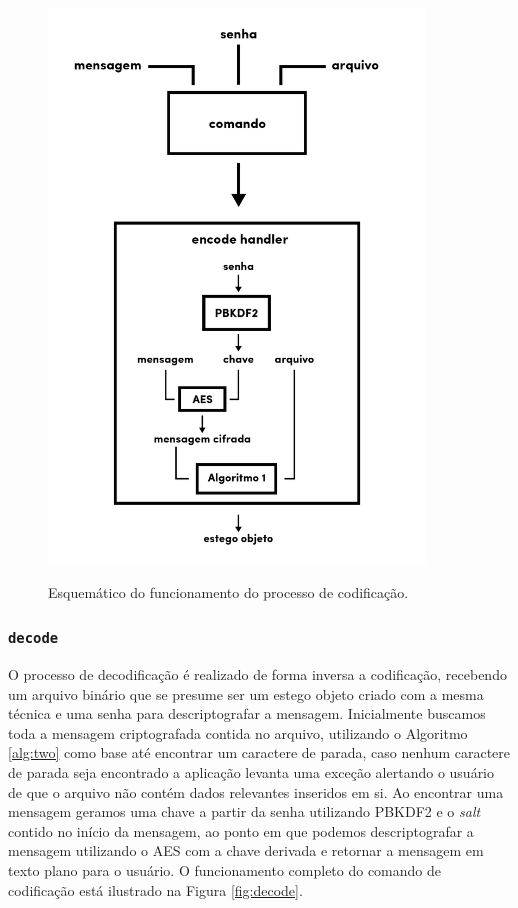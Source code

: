 \begin{figure}[!htb]
     \centering
     \caption{Esquemático do funcionamento do processo de codificação.}
     \includegraphics[width=10cm]{images/TCC4.png}
     \label{fig:encode}
\end{figure}

\subsubsection{\texttt{decode}}

O processo de decodificação é realizado de forma inversa a codificação, recebendo um arquivo binário que se presume ser um estego objeto criado com a mesma técnica e uma senha para descriptografar a mensagem. Inicialmente buscamos toda a mensagem criptografada contida no arquivo, utilizando o Algoritmo \ref{alg:two} como base até encontrar um caractere de parada, caso nenhum caractere de parada seja encontrado a aplicação levanta uma exceção alertando o usuário de que o arquivo não contém dados relevantes inseridos em si. Ao encontrar uma mensagem geramos uma chave a partir da senha utilizando PBKDF2 e o \textit{salt} contido no início da mensagem, ao ponto em que podemos descriptografar a mensagem utilizando o AES com a chave derivada e retornar a mensagem em texto plano para o usuário. O funcionamento completo do comando de codificação está ilustrado na Figura \ref{fig:decode}.

